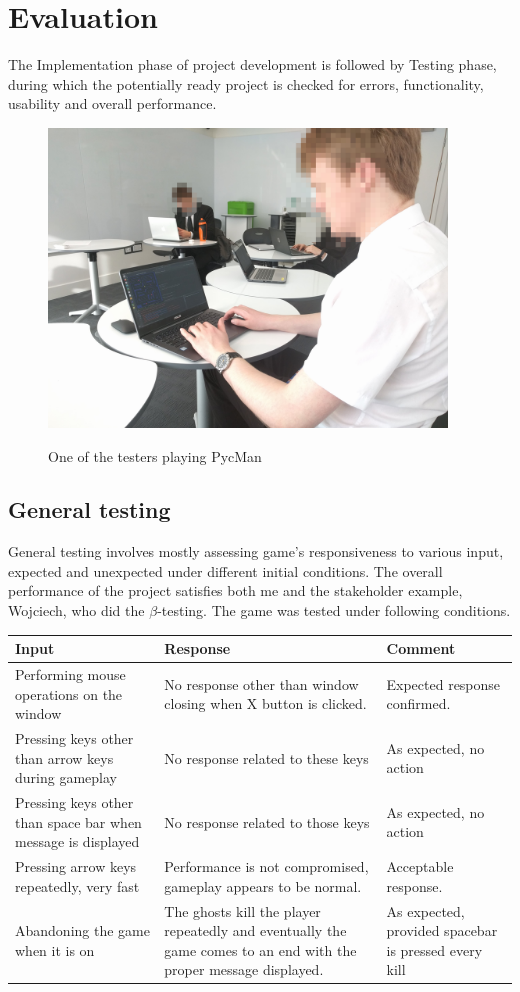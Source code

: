\documentclass[11pt,a4paper,notitlepage]{report}
\newenvironment{img}{
	\begin{center}
		\begin{figure}[H]
			\begin{center}
			
}{
	\end{center}
		\end{figure}
			\end{center}
}
\begin{document}
	\chapter{Evaluation}
		The Implementation phase of project development is followed by Testing phase, during which the potentially ready project is checked for errors, functionality, usability and overall performance.
		\begin{img}
			\includegraphics[width=300pt]{images/tester.jpg}\\
			\caption{One of the testers playing PycMan}
		\end{img}
		\section{General testing}
			General testing involves mostly assessing game's responsiveness to various input, expected and unexpected under different initial conditions.
			The overall performance of the project satisfies both me and the stakeholder example, Wojciech, who did the $\beta$-testing.
			The game was tested under following conditions.\\
			\begin{center}
				\begin{tabular}{ | p{4cm} | p{4cm} | p{3cm} |}
					\hline
					Input&Response&Comment \\ \hline
					Performing mouse operations on the window&No response other than window closing when X button is clicked.&Expected response confirmed. \\ \hline
					Pressing keys other than arrow keys during gameplay&No response related to these keys&As expected, no action \\ \hline
					Pressing keys other than space bar when message is displayed&No response related to those keys&As expected, no action \\ \hline
					Pressing arrow keys repeatedly, very fast&Performance is not compromised, gameplay appears to be normal.&Acceptable response.\\ \hline
					Abandoning the game when it is on&The ghosts kill the player repeatedly and eventually the game comes to an end with the proper message displayed.&As expected, provided spacebar is pressed every kill\\ \hline
				\end{tabular}
			\end{center}
		\newpage
\end{document}
